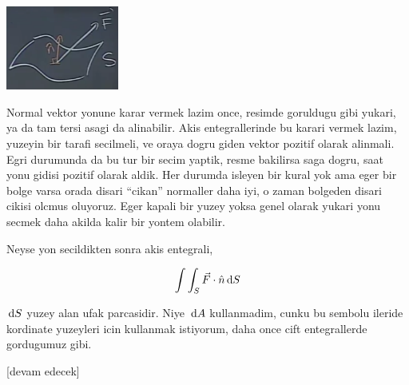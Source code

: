 \documentclass[12pt,fleqn]{article}\usepackage{../../common}
\begin{document}
\includegraphics[width=10em]{calc_multi_27_03.png}

Normal vektor yonune karar vermek lazim once, resimde goruldugu gibi yukari, ya
da tam tersi asagi da alinabilir. Akis entegrallerinde bu karari vermek lazim,
yuzeyin bir tarafi secilmeli, ve oraya dogru giden vektor pozitif olarak
alinmali. Egri durumunda da bu tur bir secim yaptik, resme bakilirsa saga dogru,
saat yonu gidisi pozitif olarak aldik. Her durumda isleyen bir kural yok ama
eger bir bolge varsa orada disari ``cikan'' normaller daha iyi, o zaman bolgeden
disari cikisi olcmus oluyoruz.  Eger kapali bir yuzey yoksa genel olarak yukari
yonu secmek daha akilda kalir bir yontem olabilir.

Neyse yon secildikten sonra akis entegrali,

$$
\int \int_S \vec{F} \cdot \hat{n} \,\mathrm{d} S
$$

$\,\mathrm{d} S$ yuzey alan ufak parcasidir. Niye $\,\mathrm{d} A$ kullanmadim, cunku bu
sembolu ileride kordinate yuzeyleri icin kullanmak istiyorum, daha once
cift entegrallerde gordugumuz gibi.









[devam edecek]
\end{document}
